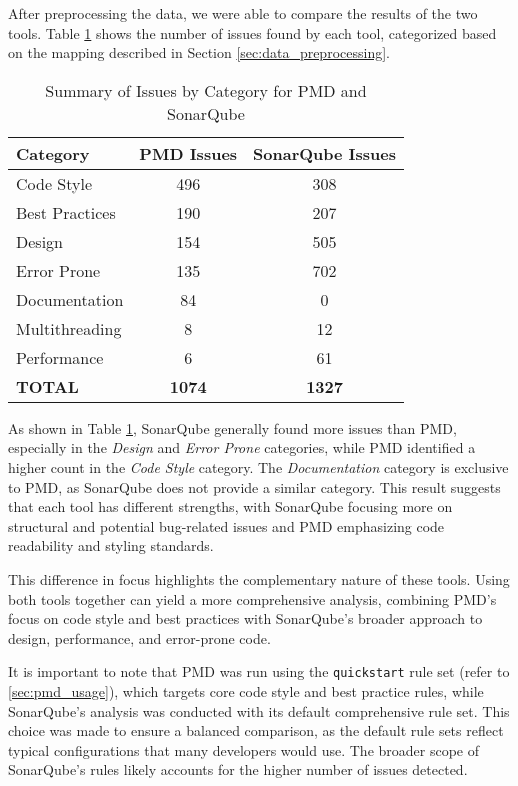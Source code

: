 After preprocessing the data, we were able to compare the results of the two tools. Table \ref{tab:sonarqube_pmd_comparison} shows the number of issues found by each tool, categorized based on the mapping described in Section \ref{sec:data_preprocessing}.

\begin{table}[H]
  \centering
  \begin{tabular}{|l|c|c|}
  \hline
  \textbf{Category} & \textbf{PMD Issues} & \textbf{SonarQube Issues} \\
  \hline
  Code Style           & 496 & 308 \\
  Best Practices       & 190 & 207 \\
  Design               & 154 & 505 \\
  Error Prone          & 135 & 702 \\
  Documentation        & 84  & 0 \\
  Multithreading       & 8   & 12 \\
  Performance          & 6   & 61 \\
  \textbf{TOTAL}       & \textbf{1074} & \textbf{1327} \\
  \hline
  \end{tabular}
  \caption{Summary of Issues by Category for PMD and SonarQube}
  \label{tab:sonarqube_pmd_comparison}
\end{table}

\noindent As shown in Table \ref{tab:sonarqube_pmd_comparison}, SonarQube generally found more issues than PMD, especially in the \textit{Design} and \textit{Error Prone} categories, while PMD identified a higher count in the \textit{Code Style} category. The \textit{Documentation} category is exclusive to PMD, as SonarQube does not provide a similar category. This result suggests that each tool has different strengths, with SonarQube focusing more on structural and potential bug-related issues and PMD emphasizing code readability and styling standards.

This difference in focus highlights the complementary nature of these tools. Using both tools together can yield a more comprehensive analysis, combining PMD's focus on code style and best practices with SonarQube's broader approach to design, performance, and error-prone code.

It is important to note that PMD was run using the \texttt{quickstart} rule set (refer to \autoref{sec:pmd_usage}), which targets core code style and best practice rules, while SonarQube’s analysis was conducted with its default comprehensive rule set. This choice was made to ensure a balanced comparison, as the default rule sets reflect typical configurations that many developers would use. The broader scope of SonarQube’s rules likely accounts for the higher number of issues detected.

